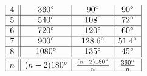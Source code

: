 \documentclass[nooutcomes,noauthor,handout]{ximera}
\begin{document}
\begin{question}
\begin{freeResponse}
\[\begin{array}{|c||c|c|c|}
        4 & 360^\circ & 90^\circ & 90^\circ \\\hline
        5 & 540^\circ & 108^\circ & 72^\circ \\\hline
        6 & 720^\circ & 120^\circ & 60^\circ\\\hline
        7 & 900^\circ & 128.6^\circ& 51.4^\circ\\\hline
        8 & 1080^\circ& 135^\circ& 45^\circ \\\hline\hline
        n & (n-2)180^\circ  & \frac{(n-2)180^\circ}{n} & \frac{360^\circ}{n}\\\hline
  \end{array}
  \]
  \end{freeResponse}
\end{question}
\end{document}
